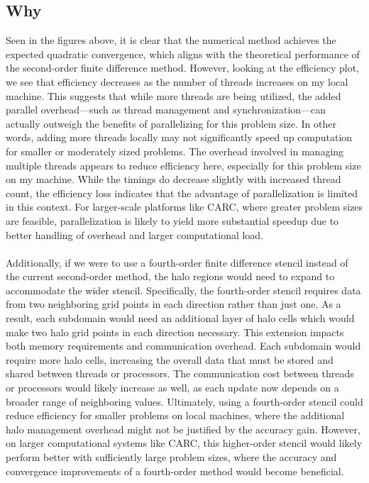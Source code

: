 \documentclass[12pt]{article}
\begin{document}
\subsection{Why}
\noindent Seen in the figures above, it is clear that the numerical method achieves the expected quadratic convergence, which aligns with the theoretical performance of the second-order finite difference method. However, looking at the efficiency plot, we see that efficiency decreases as the number of threads increases on my local machine. This suggests that while more threads are being utilized, the added parallel overhead—such as thread management and synchronization—can actually outweigh the benefits of parallelizing for this problem size. In other words, adding more threads locally may not significantly speed up computation for smaller or moderately sized problems. The overhead involved in managing multiple threads appears to reduce efficiency here, especially for this problem size on my machine. While the timings do decrease slightly with increased thread count, the efficiency loss indicates that the advantage of parallelization is limited in this context. For larger-scale platforms like CARC, where greater problem sizes are feasible, parallelization is likely to yield more substantial speedup due to better handling of overhead and larger computational load.
\\
\\
Additionally, if we were to use a fourth-order finite difference stencil instead of the current second-order method, the halo regions would need to expand to accommodate the wider stencil. Specifically, the fourth-order stencil requires data from two neighboring grid points in each direction rather than just one. As a result, each subdomain would need an additional layer of halo cells which would make two halo grid points in each direction necessary. This extension impacts both memory requirements and communication overhead. Each subdomain would require more halo cells, increasing the overall data that must be stored and shared between threads or processors. The communication cost between threads or processors would likely increase as well, as each update now depends on a broader range of neighboring values. Ultimately, using a fourth-order stencil could reduce efficiency for smaller problems on local machines, where the additional halo management overhead might not be justified by the accuracy gain. However, on larger computational systems like CARC, this higher-order stencil would likely perform better with sufficiently large problem sizes, where the accuracy and convergence improvements of a fourth-order method would become beneficial.
\end{document}
